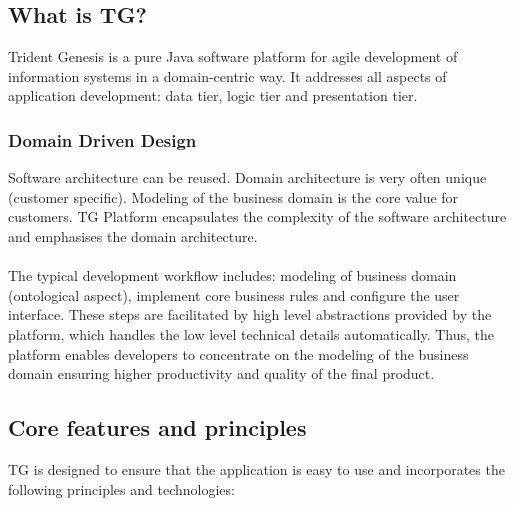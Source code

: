 \documentclass[a4paper,10pt,twocolumn]{article}
\begin{document}
\subsection*{What is TG?}
  Trident Genesis is a pure Java software platform for agile development of information systems in a domain-centric way.
  It addresses all aspects of application development: data tier, logic tier and presentation tier.

\subsubsection*{Domain Driven Design}
  Software architecture can be reused. 
  Domain architecture is very often unique (customer specific).
  Modeling of the business domain is the core value for customers.
  TG Platform encapsulates the complexity of the software architecture and emphasises the domain architecture.
  \\ \\
  \noindent The typical development workflow includes: modeling of business domain (ontological aspect), implement core business rules and configure the user interface.
  These steps are facilitated by high level abstractions provided by the platform, which handles the low level technical details automatically.
  Thus, the platform enables developers to concentrate on the modeling of the business domain ensuring higher productivity and quality of the final product.


 \subsection*{Core features and principles}
  TG is designed to ensure that the application is easy to use and incorporates the following principles and technologies:
\end{document}
